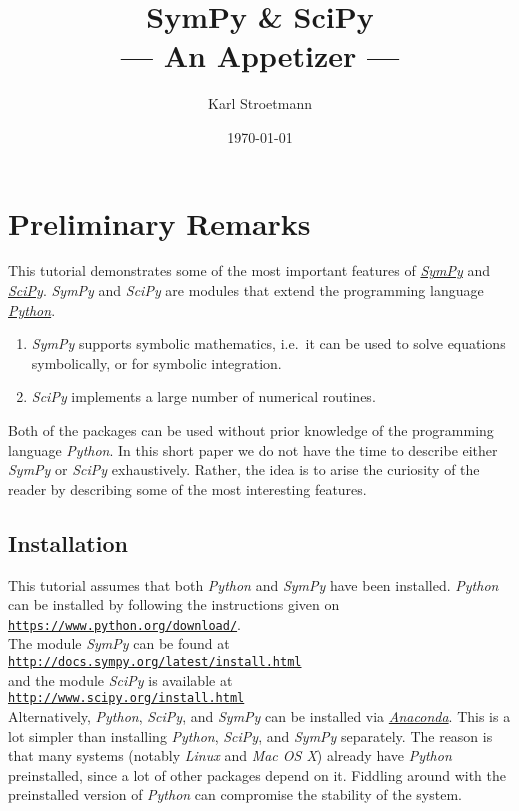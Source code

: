 \documentclass{article}
\title{SymPy \& SciPy \\[0.3cm]
      --- An Appetizer --- }
\author{Karl Stroetmann}
\date{\today}
\begin{document}
\maketitle
\tableofcontents

\section{Preliminary Remarks}
This tutorial demonstrates some of the most important features of \href{http://sympy.org/en/index.html}{\textsl{SymPy}}
and \href{http://www.scipy.org}{\textsl{SciPy}}.  \textsl{SymPy} and \textsl{SciPy} are modules that extend the
programming language \href{http://www.python.org}{\textsl{Python}}.  
\begin{enumerate}
\item \textsl{SymPy} supports symbolic mathematics, i.e.~it can be used to solve equations symbolically, or for symbolic
      integration. 
\item \textsl{SciPy} implements a large number of numerical routines.
\end{enumerate}
Both of the packages can be used without prior knowledge of the programming language \textsl{Python}.
In this short paper we do not have the time to describe either \textsl{SymPy} or \textsl{SciPy} exhaustively.  Rather,
the idea is to arise the curiosity of the reader by describing some of the most interesting features.

\subsection{Installation}
This tutorial assumes that both \textsl{Python} and
\textsl{SymPy} have been installed.  \textsl{Python} can be installed  by following the instructions given on  
\\[0.2cm]
\hspace*{1.3cm}
\href{https://www.python.org/download/}{\texttt{https://www.python.org/download/}}.
\\[0.2cm]
The module \textsl{SymPy} can be found at
\\[0.2cm]
\hspace*{1.3cm}
\href{http://docs.sympy.org/latest/install.html}{\texttt{http://docs.sympy.org/latest/install.html}}
\\[0.2cm]
and the module \textsl{SciPy} is available at
\\[0.2cm]
\hspace*{1.3cm}
\href{http://www.scipy.org/install.html}{\texttt{http://www.scipy.org/install.html}}
\\[0.2cm]
Alternatively, \textsl{Python}, \textsl{SciPy}, and \textsl{SymPy} can be installed via 
\href{https://store.continuum.io/cshop/anaconda/}{\emph{Anaconda}}.  This is a lot simpler than installing
\textsl{Python}, \textsl{SciPy}, and \textsl{SymPy} separately.  The reason is that many systems (notably \textsl{Linux}
and \textsl{Mac OS X})  already have \textsl{Python} preinstalled, since a lot of other packages depend
on it.  Fiddling around with the preinstalled version of \textsl{Python} can compromise the
stability of the system.
\end{document}
